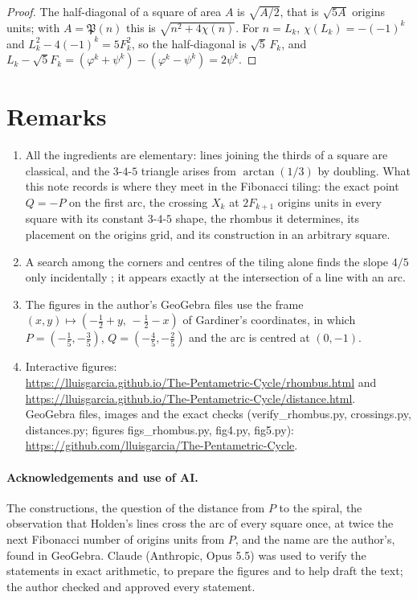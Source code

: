 \documentclass[11pt,a4paper]{article}
\theoremstyle{plain}
\theoremstyle{definition}
\theoremstyle{remark}
\begin{document}
\begin{proof}
The half-diagonal of a square of area $A$ is $\sqrt{A/2}$, that is $\sqrt{5A}$ origins units; with $A=\mathfrak{P}(n)$ this is $\sqrt{n^2+4\chi(n)}$. For $n=L_k$, $\chi(L_k)=-(-1)^k$ and $L_k^2-4(-1)^k=5F_k^2$, so the half-diagonal is $\sqrt5\,F_k$, and $L_k-\sqrt5F_k=(\varphi^k+\psi^k)-(\varphi^k-\psi^k)=2\psi^k$.
\end{proof}

\section{Remarks}

\begin{enumerate}[leftmargin=*,itemsep=2pt]
\item All the ingredients are elementary: lines joining the thirds of a square are classical, and the $3$-$4$-$5$ triangle arises from $\arctan(1/3)$ by doubling. What this note records is where they meet in the Fibonacci tiling: the exact point $Q=-P$ on the first arc, the crossing $X_k$ at $2F_{k+1}$ origins units in every square with its constant $3$-$4$-$5$ shape, the rhombus it determines, its placement on the origins grid, and its construction in an arbitrary square.
\item A search among the corners and centres of the tiling alone finds the slope $4/5$ only incidentally \cite{site}; it appears exactly at the intersection of a line with an arc.
\item The figures in the author's GeoGebra files use the frame $(x,y)\mapsto(-\tfrac12+y,\,-\tfrac12-x)$ of Gardiner's coordinates, in which $P=(-\tfrac15,-\tfrac35)$, $Q=(-\tfrac45,-\tfrac25)$ and the arc is centred at $(0,-1)$.
\item \sloppy Interactive figures:\\ \url{https://lluisgarcia.github.io/The-Pentametric-Cycle/rhombus.html} and\\ \url{https://lluisgarcia.github.io/The-Pentametric-Cycle/distance.html}.\\ GeoGebra files, images and the exact checks (verify\_rhombus.py, crossings.py, distances.py; figures figs\_rhombus.py, fig4.py, fig5.py):\\ \url{https://github.com/lluisgarcia/The-Pentametric-Cycle}.
\end{enumerate}

\paragraph{Acknowledgements and use of AI.} The constructions, the question of the distance from $P$ to the spiral, the observation that Holden's lines cross the arc of every square once, at twice the next Fibonacci number of origins units from $P$, and the name are the author's, found in GeoGebra. Claude (Anthropic, Opus 5.5) was used to verify the statements in exact arithmetic, to prepare the figures and to help draft the text; the author checked and approved every statement.
\end{document}
